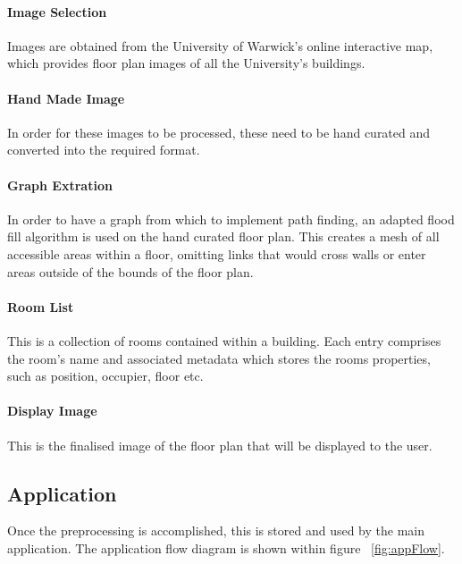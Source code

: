 \documentclass[12pt,a4paper]{report}
\begin{document}
\paragraph{Image Selection}
Images are obtained from the University of Warwick's online interactive map, which provides floor plan images of all the University's buildings.

\paragraph{Hand Made Image}
In order for these images to be processed, these need to be hand curated and converted into the required format.

\paragraph{Graph Extration}
In order to have a graph from which to implement path finding, an adapted flood fill algorithm is used on the hand curated floor plan. This creates a mesh of all accessible areas within a floor, omitting links that would cross walls or enter areas outside of the bounds of the floor plan.

\paragraph{Room List}
This is a collection of rooms contained within a building. Each entry comprises the room's name and associated metadata which stores the rooms properties, such as position, occupier, floor etc.

\paragraph{Display Image}
This is the finalised image of the floor plan that will be displayed to the user.

\subsection{Application}
Once the preprocessing is accomplished, this is stored and used by the main application. The application flow diagram is shown within figure ~\ref{fig:appFlow}.
\end{document}
